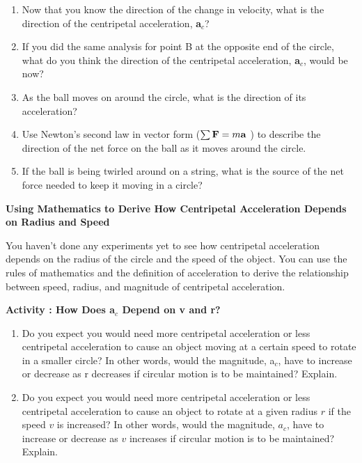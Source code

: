 \begin{enumerate}
\item Now that you know the direction of the change in velocity, what is the direction
of the centripetal acceleration, \textbf{a}\( _{c} \)?
\vspace{18mm}

\item If you did the same analysis for point B at the opposite end of the circle,
what do you think the direction of the centripetal acceleration, \textbf{a}\( _{c} \),
would be now?
\vspace{18mm}

\item As the ball moves on around the circle, what is the direction of its acceleration?
\vspace{18mm}

\item Use Newton's second law in vector form (\( \sum {\bf F} = m{\bf a}\)
) to describe the direction of the net force on the ball as it moves around
the circle.
\vspace{18mm}

\item If the ball is being twirled around on a string, what is the source of the
net force needed to keep it moving in a circle?
\vspace{18mm}

\end{enumerate}

\newpage 

\textbf{Using Mathematics to Derive How Centripetal Acceleration Depends on
Radius and Speed }

You haven't done any experiments yet to see how centripetal acceleration depends
on the radius of the circle and the speed of the object. You can use the rules
of mathematics and the definition of acceleration to derive the relationship
between speed, radius, and magnitude of centripetal acceleration. 

\textbf{Activity : How Does a\( _{c} \) Depend on v and r?} 

\begin{enumerate}

\item Do you expect you would need more centripetal acceleration or less centripetal
acceleration to cause an object moving at a certain speed to rotate in a smaller
circle? In other words, would the magnitude, a\( _{c} \), have to increase
or decrease as r decreases if circular motion is to be maintained? Explain.
\vspace{20mm}

\item Do you expect you would need more centripetal acceleration or less centripetal
acceleration to cause an object to rotate at a given radius $r$ if the speed $v$
is increased? In other words, would the magnitude, \( a_{c} \), have to increase
or decrease as $v$ increases if circular motion is to be maintained? Explain.
\vspace{20mm}

\end{enumerate}

